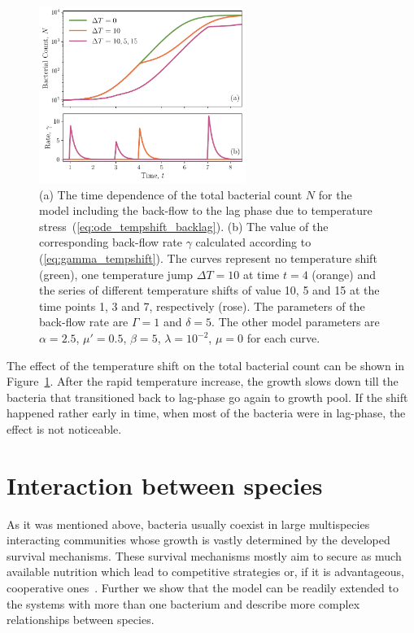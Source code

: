 \documentclass[10pt,A4paper]{article}
\numberwithin{equation}{section}
\begin{document}
\begin{figure}[t]
    \begin{center}
    \includegraphics[width=0.6\textwidth]{Figures/pool_model_3pools_resource_tempshift.pdf}
    \caption{
        (a) The time dependence of the total bacterial count $N$ for the model including the back-flow to the lag phase due to temperature stress~(\ref{eq:ode_tempshift_backlag}).
        (b) The value of the corresponding back-flow rate $\gamma$ calculated according to (\ref{eq:gamma_tempshift}).
        The curves represent no temperature shift (green), one temperature jump $\Delta T = 10$ at time $t=4$ (orange)
        and the series of different temperature shifts of value 10, 5 and 15 at the time points 1, 3 and 7, respectively (rose).
        The parameters of the back-flow rate are $\Gamma=1$ and $\delta=5$.
        The other model parameters are $\alpha=2.5$, $\mu'=0.5$, $\beta=5$, $\lambda=10^{-2}$, $\mu = 0$ for each curve.
    }
    \label{fig:TempJump}
    \end{center}
\end{figure}
The effect of the temperature shift on the total bacterial count can be shown in Figure~\ref{fig:TempJump}.
After the rapid temperature increase, the growth slows down till the bacteria that transitioned back to lag-phase go again to growth pool.
If the shift happened rather early in time, when most of the bacteria were in lag-phase, the effect is not noticeable.
\newpage
%
%
%
\section{Interaction between species}
As it was mentioned above, bacteria usually coexist in large multispecies interacting communities whose growth is vastly determined by the developed survival mechanisms.
These survival mechanisms mostly aim to secure as much available nutrition which lead to competitive strategies or, if it is advantageous, cooperative ones~\cite{hibbing_bacterial_2010, stubbendieck_bacterial_2016}.
Further we show that the model can be readily extended to the systems with more than one bacterium and describe more complex relationships between species. 
%
%
%
\end{document}
